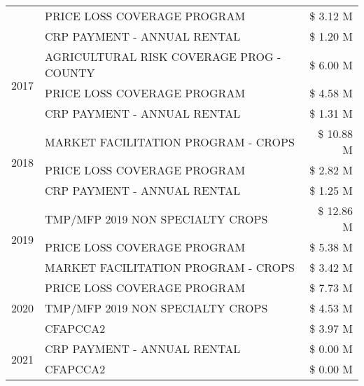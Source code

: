 \begin{tabular}{llr}
 & PRICE LOSS COVERAGE PROGRAM & \$ 3.12 M \\
 & CRP PAYMENT - ANNUAL RENTAL & \$ 1.20 M \\
\cline{1-3}
\multirow[t]{3}{*}{2017} & AGRICULTURAL RISK COVERAGE PROG - COUNTY & \$ 6.00 M \\
 & PRICE LOSS COVERAGE PROGRAM & \$ 4.58 M \\
 & CRP PAYMENT - ANNUAL RENTAL & \$ 1.31 M \\
\cline{1-3}
\multirow[t]{3}{*}{2018} & MARKET FACILITATION PROGRAM - CROPS & \$ 10.88 M \\
 & PRICE LOSS COVERAGE PROGRAM & \$ 2.82 M \\
 & CRP PAYMENT - ANNUAL RENTAL & \$ 1.25 M \\
\cline{1-3}
\multirow[t]{3}{*}{2019} & TMP/MFP 2019 NON SPECIALTY CROPS & \$ 12.86 M \\
 & PRICE LOSS COVERAGE PROGRAM & \$ 5.38 M \\
 & MARKET FACILITATION PROGRAM - CROPS & \$ 3.42 M \\
\cline{1-3}
\multirow[t]{3}{*}{2020} & PRICE LOSS COVERAGE PROGRAM & \$ 7.73 M \\
 & TMP/MFP 2019 NON SPECIALTY CROPS & \$ 4.53 M \\
 & CFAPCCA2 & \$ 3.97 M \\
\cline{1-3}
\multirow[t]{2}{*}{2021} & CRP PAYMENT - ANNUAL RENTAL & \$ 0.00 M \\
 & CFAPCCA2 & \$ 0.00 M \\
\cline{1-3}
\bottomrule
\end{tabular}
